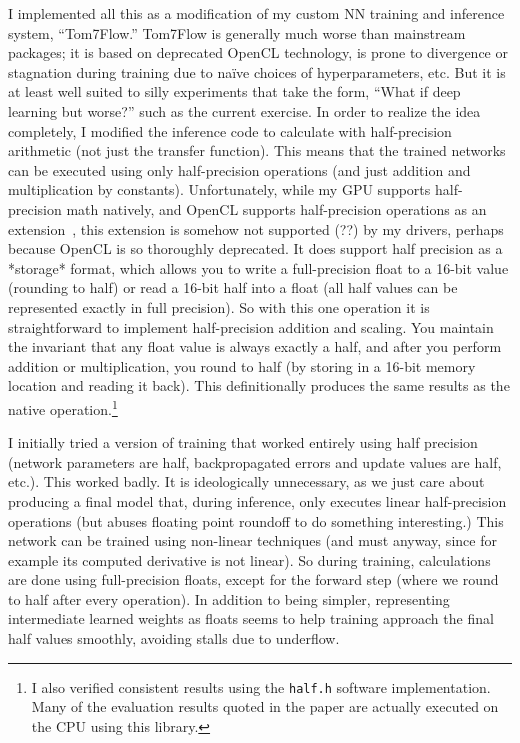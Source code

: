 \documentclass[twocolumn]{article}
\begin{document}
I implemented all this as a modification of my custom NN training and
inference system, ``Tom7Flow.'' Tom7Flow is generally much worse than
mainstream packages; it is based on deprecated OpenCL technology, is
prone to divergence or stagnation during training due to na\"ive
choices of hyperparameters, etc. But it is at least well suited to
silly experiments that take the form, ``What if deep learning but
worse?'' such as the current exercise. In order to realize the idea
completely, I modified the inference code to calculate with
half-precision arithmetic (not just the transfer function). This means
that the trained networks can be executed using only half-precision
operations (and just addition and multiplication by constants).
Unfortunately, while my GPU supports half-precision math natively, and
OpenCL supports half-precision operations as an
extension~\cite{openclextensions}, this extension is somehow not
supported (??) by my drivers, perhaps because OpenCL is so thoroughly
deprecated. It does support half precision as a *storage* format,
which allows you to write a full-precision float to a 16-bit value
(rounding to half) or read a 16-bit half into a float (all half values
can be represented exactly in full precision). So with this one
operation it is straightforward to implement half-precision addition
and scaling. You maintain the invariant that any float value is always
exactly a half, and after you perform addition or multiplication, you
round to half (by storing in a 16-bit memory location and reading it
back). This definitionally produces the same results as the native
operation.\footnote{I also verified consistent results using the
  \verb+half.h+ software implementation. Many of the evaluation
  results quoted in the paper are actually executed on the CPU
  using this library.}

I initially tried a version of training that worked entirely using
half precision (network parameters are half, backpropagated errors and
update values are half, etc.). This worked badly. It is ideologically
unnecessary, as we just care about producing a final model that,
during inference, only executes linear half-precision operations (but
abuses floating point roundoff to do something interesting.) This
network can be trained using non-linear techniques (and must anyway,
since for example its computed derivative is not linear). So during
training, calculations are done using full-precision floats, except
for the forward step (where we round to half after every operation).
In addition to being simpler, representing intermediate learned
weights as floats seems to help training approach the final half
values smoothly, avoiding stalls due to underflow.
\end{document}
